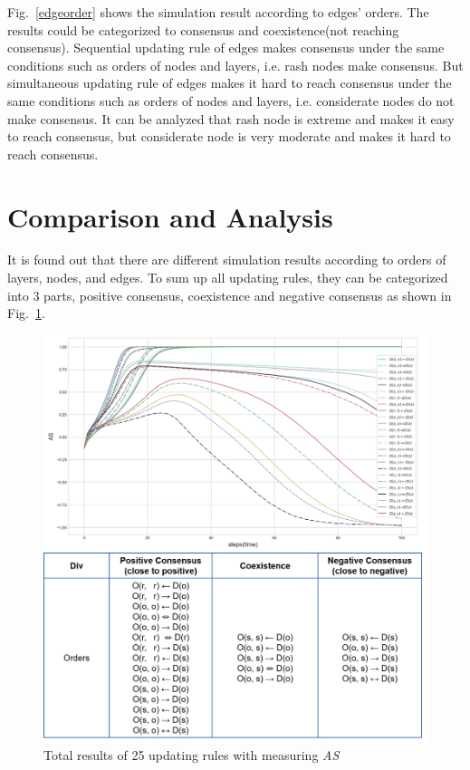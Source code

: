 Fig.~\ref{edgeorder} shows the simulation result according to edges' orders. The results could be categorized to consensus and coexistence(not reaching consensus). Sequential updating rule of edges makes consensus under the same conditions such as orders of nodes and layers, i.e. rash nodes make consensus. But simultaneous updating rule of edges makes it hard to reach consensus under the same conditions such as orders of nodes and layers, i.e. considerate nodes do not make consensus. It can be analyzed that rash node is extreme and makes it easy to reach consensus, but considerate node is very moderate and makes it hard to reach consensus.\\
 
\section{Comparison and Analysis}
It is found out that there are different simulation results according to orders of layers, nodes, and edges. To sum up all updating rules, they can be categorized into $3$ parts, positive consensus, coexistence and negative consensus as shown in Fig.~\ref{ordertotal}. 
 
\begin{figure}[!htb]
	\centering
	\includegraphics[width=\hsize]{figure/chap4_ordertotal.png}
	\caption{Total results of 25 updating rules with measuring \textit{AS}}
	\label{ordertotal}
\end{figure}


